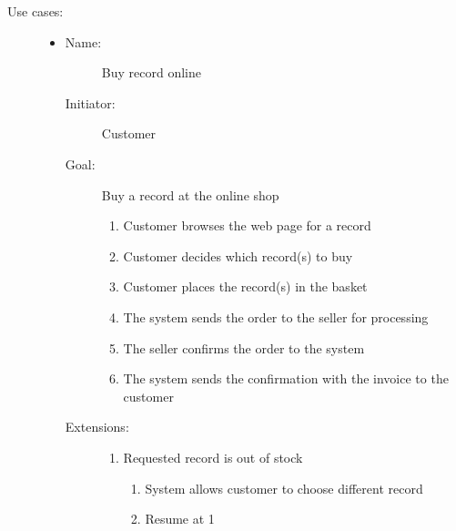 \documentclass[12pt, titlepage, a4paper]{article}
\begin{document}
\begin{description}
    \item[Use cases:] \hfil
    \begin{itemize}
    \item
        \begin{description}
            \item[Name:]Buy record online 
            \item[Initiator:]Customer
            \item[Goal:]Buy a record at the online shop 
            \begin{enumerate}
                \item Customer browses the web page for a record
                \item Customer decides which record(s) to buy
                \item Customer places the record(s) in the basket
                \item The system sends the order to the seller for processing
                \item The seller confirms the order to the system
                \item The system sends the confirmation with the invoice to the customer
            \end{enumerate}
            \item[Extensions:] \hfil
            \begin{enumerate}
                \item Requested record is out of stock
                \begin{enumerate}
                    \item System allows customer to choose different record
                    \item Resume at 1
                \end{enumerate}
            \end{enumerate}
        \end{description}


\end{itemize}
\end{description}
\end{document}
